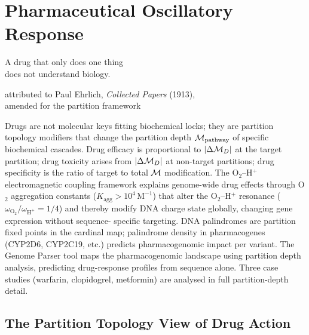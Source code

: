 
\chapter{Pharmaceutical Oscillatory Response}
\label{chap:pharmacology}

\epigraph{%
  A drug that only does one thing\\
  does not understand biology.%
}{attributed to Paul Ehrlich, \textit{Collected Papers} (1913),\\
  amended for the partition framework}

\begin{chapterbox}
Drugs are not molecular keys fitting biochemical locks; they are partition
topology modifiers that change the partition depth $\mathcal{M}_{\mathrm{pathway}}$
of specific biochemical cascades. Drug efficacy is proportional to
$|\Delta\mathcal{M}_D|$ at the target partition; drug toxicity arises from
$|\Delta\mathcal{M}_D|$ at non-target partitions; drug specificity is the ratio of
target to total $\mathcal{M}$ modification. The O$_2$--H$^+$ electromagnetic coupling
framework explains genome-wide drug effects through O$_2$ aggregation constants
($K_{\mathrm{agg}} > 10^4\,\mathrm{M}^{-1}$) that alter the O$_2$--H$^+$
resonance ($\omega_{\mathrm{O}_2}/\omega_{\mathrm{H}^+} = 1/4$) and thereby
modify DNA charge state globally, changing gene expression without sequence-
specific targeting. DNA palindromes are partition fixed points in the cardinal
map; palindrome density in pharmacogenes (CYP2D6, CYP2C19, etc.) predicts
pharmacogenomic impact per variant. The Genome Parser tool maps the
pharmacogenomic landscape using partition depth analysis, predicting
drug-response profiles from sequence alone. Three case studies (warfarin,
clopidogrel, metformin) are analysed in full partition-depth detail.
\end{chapterbox}

\section{The Partition Topology View of Drug Action}
\label{sec:drug_topology}

